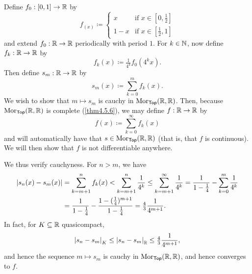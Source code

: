 \begin{exm}
\begin{savenotes}
Define $f_0:[0,1]\rightarrow \mathbb{R}$ by
\begin{equation}
f_(x)\coloneqq \begin{cases}x & \text{if }x\in [0,\tfrac{1}{2}] \\ 1-x & \text{if }x\in [\tfrac{1}{2},1]\end{cases}
\end{equation}
and extend $f_0:\mathbb{R} \rightarrow \mathbb{R}$ periodically with period $1$.  For $k\in \mathbb{N}$, now define $f_k:\mathbb{R} \rightarrow \mathbb{R}$ by
\begin{equation}
f_k(x)\coloneqq \tfrac{1}{4^k}f_0(4^kx).
\end{equation}
Then define $s_m:\mathbb{R} \rightarrow \mathbb{R}$ by
\begin{equation}
s_m(x)\coloneqq \sum _{k=0}^mf_k(x).
\end{equation}
We wish to show that $m\mapsto s_m$ is cauchy in $\operatorname{Mor} _{\mathsf{Top}}(\mathbb{R},\mathbb{R} )$.    Then, because $\operatorname{Mor} _{\mathsf{Top}}(\mathbb{R} ,\mathbb{R} )$ is complete (\cref{thm4.5.6}), we may define $f:\mathbb{R} \rightarrow \mathbb{R}$ by
\begin{equation}
f(x)\coloneqq \sum _{k=0}^\infty f_k(x)
\end{equation}
and will automatically have that $s\in \operatorname{Mor} _{\mathsf{Top}}(\mathbb{R} ,\mathbb{R} )$ (that is, that $f$ is continuous).  We will then show that $f$ is not differentiable anywhere.

We thus verify cauchyness.  For $n>m$, we have
\begin{equation}
\begin{split}
\lvert s_n(x)-s_m(x)\rvert & =\sum _{k=m+1}^nf_k(x)<\sum _{k=m+1}^n\frac{1}{4^k}\leq \sum _{k=m+1}^\infty \frac{1}{4^k}=\frac{1}{1-\tfrac{1}{4}}-\sum _{k=0}^m\frac{1}{4^k} \\
& =\frac{1}{1-\tfrac{1}{4}}-\frac{1-(\tfrac{1}{4})^{m+1}}{1-\tfrac{1}{4}}=\tfrac{4}{3}\frac{1}{4^{m+1}}.
\end{split}
\end{equation}
In fact, for $K\subseteq \mathbb{R}$ quasicompact,
\begin{equation}
\norm[s_n-s_m]_K\leq \norm[s_n-s_m]_{\R}\leq \tfrac{4}{3}\frac{1}{4^{m+1}},
\end{equation}
and hence the sequence $m\mapsto s_m$ is cauchy in $\operatorname{Mor} _{\mathsf{Top}}(\mathbb{R} ,\mathbb{R} )$, and hence converges to $f$.


\end{savenotes}
\end{exm}
